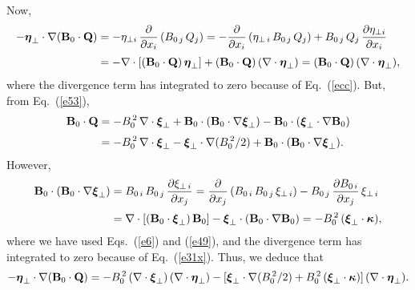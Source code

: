 \documentclass[12pt,prb,aps,notitlepage]{revtex4-1}
\newcommand{\bxi}{\mbox{\boldmath$\xi$}}
\newcommand{\bta}{\mbox{\boldmath$\eta$}}
\newcommand{\bkappa}{\mbox{\boldmath$\kappa$}}
\begin{document}
Now,
\begin{align}
-\bta_\perp\cdot\nabla ({\bf B}_0\cdot{\bf Q}) &= -\eta_{\perp i}\,\frac{\partial}{\partial x_i}\,(B_{0\,j}\,Q_j) = - \frac{\partial}{\partial x_i}\,(\eta_{\perp\,i}\,B_{0\,j}\,Q_j)+ B_{0\,j}\,Q_j\,\frac{\partial \eta_{\perp i}}{\partial x_i}\nonumber\\[0.5ex]
&= -\nabla\cdot[({\bf B}_0\cdot {\bf Q})\,\bta_\perp]  +({\bf B}_0\cdot{\bf Q})\,(\nabla\cdot\bta_\perp)=   ({\bf B}_0\cdot{\bf Q})\,(\nabla\cdot\bta_\perp),
\end{align}
where the divergence term has  integrated to zero because of Eq.~(\ref{ecc}). 
But, from Eq.~(\ref{e53}), 
\begin{align}
{\bf B}_0\cdot{\bf Q} &= - B_0^{\,2}\,\nabla\cdot\bxi_\perp + {\bf B}_0\cdot ({\bf B}_0\cdot\nabla\bxi_\perp) - {\bf B}_0\cdot
(\bxi_\perp\cdot\nabla {\bf B}_0)\nonumber\\[0.5ex]
&=- B_0^{\,2}\,\nabla\cdot\bxi_\perp - \bxi_\perp\cdot\nabla(B_0^{\,2}/2) + {\bf B}_0\cdot ({\bf B}_0\cdot\nabla\bxi_\perp).
\end{align}
However,
\begin{align}
 {\bf B}_0\cdot ({\bf B}_0\cdot\nabla\bxi_\perp) &= 
 B_{0\,i}\,B_{0\,j}\,\frac{\partial \xi_{\perp\,i}}{\partial x_j}= \frac{\partial}{\partial x_j}\,(B_{0\,i}\,B_{0\,j}\,\xi_{\perp\,i})- B_{0\,j} \,\frac{\partial B_{0\,i}}{\partial x_j}\,\xi_{\perp\,i}\nonumber\\[0.5ex]
 &= \nabla\cdot[({\bf B}_0\cdot\bxi_\perp)\,{\bf B}_0] - \bxi_\perp\cdot({\bf B}_0\cdot\nabla{\bf B}_0) = -B_0^{\,2}\,(\bxi_\perp\cdot\bkappa),
 \end{align}
 where we have  used Eqs.~(\ref{e6}) and (\ref{e49}), and the divergence term has  integrated to zero because of Eq.~(\ref{e31x}). 
 Thus, we deduce that
 \begin{equation}\label{e60}
 -\bta_\perp\cdot\nabla ({\bf B}_0\cdot{\bf Q}) = -B_0^{\,2}\,(\nabla\cdot\bxi_\perp)\,(\nabla\cdot\bta_\perp)
 -[\bxi_\perp\cdot\nabla(B_0^{\,2}/2) + B_0^{\,2}\,(\bxi_\perp\cdot\bkappa)]\,(\nabla\cdot\bta_\perp).
 \end{equation}
 
\end{document}

